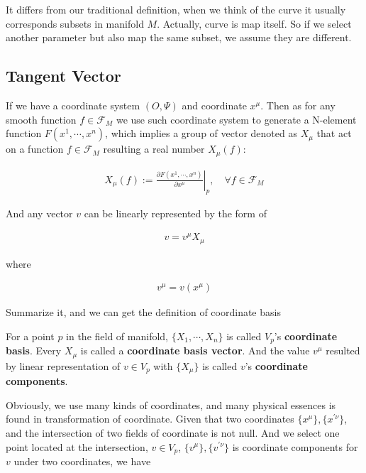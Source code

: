 It differs from our traditional definition, when we think of the curve it usually corresponds subsets in manifold $M$. Actually, curve is map itself. So if we select another parameter but also map the same subset, we assume they are different. 




\subsection{Tangent Vector}

If we have a coordinate system $(O,\Psi)$ and coordinate $x^{\mu}$. Then as for any smooth function $f\in \mathscr{F}_{M}$ we use such coordinate system to generate a N-element function $F(x^{1},\cdots, x^{n})$, which implies a group of vector denoted as $X_{\mu}$ that act on a function $f\in \mathscr{F}_{M}$ resulting a real number $X_{\mu}(f)$:

\begin{align}
    X_{\mu}(f):=\left.\frac{\partial F(x^{1},\cdots, x^{n})}{\partial x^{\mu}}\right|_{p}, \quad \forall f\in \mathscr{F}_{M}
\end{align}

And any vector $v$ can be linearly represented by the form of 

\begin{align}
    v=v^{\mu}X_{\mu}
\end{align}

where 

\begin{align}
    v^{\mu}=v(x^{\mu})
\end{align}

Summarize it, and we can get the definition of coordinate basis 

\begin{tcolorbox}[title=\textbf{Coordinate},colback=SeaGreen!10!CornflowerBlue!10,colframe=RoyalPurple!55!Aquamarine!100!]
    For a point $p$ in the field of manifold, $\{X_{1},\cdots,X_{n}\}$ is called $V_{p}$'s \textbf{coordinate basis}. 
    Every $X_{\mu}$ is called a \textbf{coordinate basis vector}. And the value $v^{\mu}$ resulted by linear representation of $v\in V_{p}$ with $\{X_{\mu}\}$ is called $v$'s \textbf{coordinate components}.
\end{tcolorbox}

Obviously, we use many kinds of coordinates, and many physical essences is found in transformation of coordinate. Given that two coordinates $\{x^{\mu}\}, \{x^{\prime\nu}\}$, and the intersection of two fields of coordinate is not null. And we select one point located at the intersection, $v\in V_{p}$, $\{v^{\mu}\},\{v^{\prime \nu}\}$ is coordinate components for $v$ under two coordinates, we have


